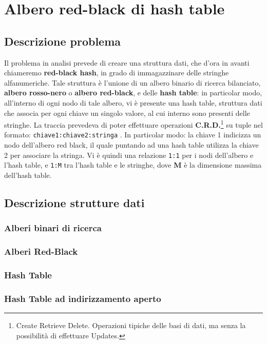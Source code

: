 \def\baselinestretch{1}
\chapter{ Albero red-black di hash table }
\def\baselinestretch{1.66}
\thispagestyle{headings}

\def\baselinestretch{1}
\section{Descrizione problema}
\def\baselinestretch{1.66}
\thispagestyle{headings}

Il problema in analisi prevede di creare una struttura dati, che d'ora in avanti chiameremo
\textbf{red-black hash}, in grado di immagazzinare delle stringhe alfanumeriche. Tale struttura
\`e l'unione di un albero binario di ricerca bilanciato, \textbf{albero rosso-nero} o \textbf{albero
red-black}, e delle \textbf{hash table}: in particolar modo, all'interno di ogni nodo di tale albero,
vi \`e presente una hash table, struttura dati che associa per ogni chiave un singolo valore, al cui
interno sono presenti delle stringhe. La traccia prevedeva di poter effettuare operazioni
\textbf{C.R.D.}\footnote{Create Retrieve Delete. Operazioni tipiche delle basi di dati, ma senza la
possibilit\`a di effettuare Updates.} su tuple nel formato: \verb|chiave1:chiave2:stringa| . 
In particolar modo: la chiave 1 indicizza un nodo dell'albero red black, il quale puntando ad una hash
table utilizza la chiave 2 per associare la stringa.
Vi \`e quindi una relazione \verb|1:1| per i nodi dell'albero e l'hash table, e \verb|1:M| tra l'hash table
e le stringhe, dove \textbf{M} \`e la dimensione massima dell'hash table.

\def\baselinestretch{1}
\section{Descrizione strutture dati}
\def\baselinestretch{1.66}
\thispagestyle{headings}

\subsection{Alberi binari di ricerca}

\subsection{Alberi Red-Black}

\subsection{Hash Table}

\subsection{Hash Table ad indirizzamento aperto}

